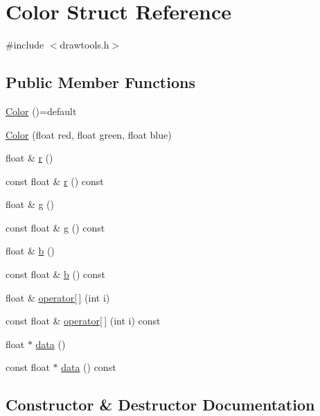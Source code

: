 \hypertarget{struct_color}{}\section{Color Struct Reference}
\label{struct_color}


{\ttfamily \#include $<$drawtools.\+h$>$}

\subsection*{Public Member Functions}
\begin{DoxyCompactItemize}
\item 
\hyperlink{struct_color_a6fae8aa8b75d27cb134234e75b41caf2}{Color} ()=default
\item 
\hyperlink{struct_color_aa347facf3fa618a4817f94bef0c5d424}{Color} (float red, float green, float blue)
\item 
float \& \hyperlink{struct_color_a9023bb1107a89197950986157c4ef9de}{r} ()
\item 
const float \& \hyperlink{struct_color_aa8c2969df95019d942a36793120248f6}{r} () const 
\item 
float \& \hyperlink{struct_color_a4b63eac9efcfc3f626f10f43f4f13391}{g} ()
\item 
const float \& \hyperlink{struct_color_a47cf7afc5de2d5e3521a7fee442a9b24}{g} () const 
\item 
float \& \hyperlink{struct_color_a48ea644ea0e8f943f5049a1fae966c55}{b} ()
\item 
const float \& \hyperlink{struct_color_a2ded0f51cf6b9d7e570a10226c86f3cd}{b} () const 
\item 
float \& \hyperlink{struct_color_a825baaf508fa1fc1e7a5ed2715f21d95}{operator\mbox{[}$\,$\mbox{]}} (int i)
\item 
const float \& \hyperlink{struct_color_a5fa45b9e99a450800071d85b7ea1597e}{operator\mbox{[}$\,$\mbox{]}} (int i) const 
\item 
float $\ast$ \hyperlink{struct_color_a40cd03d7f9e5f481f163ddefff8e8cee}{data} ()
\item 
const float $\ast$ \hyperlink{struct_color_aa38a1482c148509679a046239bf9a3d9}{data} () const 
\end{DoxyCompactItemize}


\subsection{Constructor \& Destructor Documentation}
